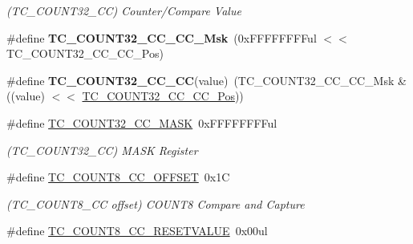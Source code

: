 \begin{DoxyCompactItemize}
\begin{DoxyCompactList}\small\item\em (T\+C\+\_\+\+C\+O\+U\+N\+T32\+\_\+\+C\+C) Counter/\+Compare Value \end{DoxyCompactList}\item 
\hypertarget{group___s_a_m_l21___t_c_ga535ca783b831120a0c69b0a3041f13bb}{}\#define {\bfseries T\+C\+\_\+\+C\+O\+U\+N\+T32\+\_\+\+C\+C\+\_\+\+C\+C\+\_\+\+Msk}~(0x\+F\+F\+F\+F\+F\+F\+F\+Ful $<$$<$ T\+C\+\_\+\+C\+O\+U\+N\+T32\+\_\+\+C\+C\+\_\+\+C\+C\+\_\+\+Pos)\label{group___s_a_m_l21___t_c_ga535ca783b831120a0c69b0a3041f13bb}

\item 
\hypertarget{group___s_a_m_l21___t_c_ga7189af9e4ee53d1ac0938f6006df92e8}{}\#define {\bfseries T\+C\+\_\+\+C\+O\+U\+N\+T32\+\_\+\+C\+C\+\_\+\+C\+C}(value)~(T\+C\+\_\+\+C\+O\+U\+N\+T32\+\_\+\+C\+C\+\_\+\+C\+C\+\_\+\+Msk \& ((value) $<$$<$ \hyperlink{group___s_a_m_l21___t_c_gae28461f5839eb01e80a6379fe7faf924}{T\+C\+\_\+\+C\+O\+U\+N\+T32\+\_\+\+C\+C\+\_\+\+C\+C\+\_\+\+Pos}))\label{group___s_a_m_l21___t_c_ga7189af9e4ee53d1ac0938f6006df92e8}

\item 
\hypertarget{group___s_a_m_l21___t_c_ga6da0d3555aeb20ef687de45438fbc2da}{}\#define \hyperlink{group___s_a_m_l21___t_c_ga6da0d3555aeb20ef687de45438fbc2da}{T\+C\+\_\+\+C\+O\+U\+N\+T32\+\_\+\+C\+C\+\_\+\+M\+A\+S\+K}~0x\+F\+F\+F\+F\+F\+F\+F\+Ful\label{group___s_a_m_l21___t_c_ga6da0d3555aeb20ef687de45438fbc2da}

\begin{DoxyCompactList}\small\item\em (T\+C\+\_\+\+C\+O\+U\+N\+T32\+\_\+\+C\+C) M\+A\+S\+K Register \end{DoxyCompactList}\item 
\hypertarget{group___s_a_m_l21___t_c_ga64bf641418f049a967b65990807f165d}{}\#define \hyperlink{group___s_a_m_l21___t_c_ga64bf641418f049a967b65990807f165d}{T\+C\+\_\+\+C\+O\+U\+N\+T8\+\_\+\+C\+C\+\_\+\+O\+F\+F\+S\+E\+T}~0x1\+C\label{group___s_a_m_l21___t_c_ga64bf641418f049a967b65990807f165d}

\begin{DoxyCompactList}\small\item\em (T\+C\+\_\+\+C\+O\+U\+N\+T8\+\_\+\+C\+C offset) C\+O\+U\+N\+T8 Compare and Capture \end{DoxyCompactList}\item 
\hypertarget{group___s_a_m_l21___t_c_ga09abf72b575bcaba5ae5f6fa4b468d85}{}\#define \hyperlink{group___s_a_m_l21___t_c_ga09abf72b575bcaba5ae5f6fa4b468d85}{T\+C\+\_\+\+C\+O\+U\+N\+T8\+\_\+\+C\+C\+\_\+\+R\+E\+S\+E\+T\+V\+A\+L\+U\+E}~0x00ul\label{group___s_a_m_l21___t_c_ga09abf72b575bcaba5ae5f6fa4b468d85}


\end{DoxyCompactItemize}
